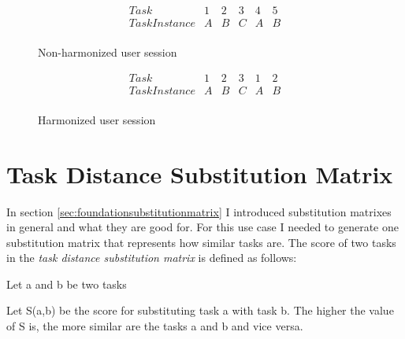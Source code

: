 \begin{figure}[h]
\[
\begin{array}{r|ccccc}
	Task & 1 & 2 & 3 & 4 & 5\\
	\hline
	TaskInstance & A & B & C & A & B\\
\end{array} 
\]
\caption{Non-harmonized user session}
\label{fig:nonharmonized}
\end{figure}

\begin{figure}[h]
\[
\begin{array}{r|ccccc}
	Task & 1 & 2 & 3 & 1 & 2\\
	\hline
	TaskInstance & A & B & C & A & B\\
\end{array} 
\]
\caption{Harmonized user session}
\label{fig:harmonized}
\end{figure}


\section{Task Distance Substitution Matrix}
In section \ref{sec:foundationsubstitutionmatrix} I introduced substitution matrixes in general and what they are good for. 
For this use case I needed to generate one substitution matrix that represents how similar tasks are. 
The score of two tasks in the \textit{task distance substitution matrix} is defined as follows:
\begin{definition}
	\item Let a and b be two tasks
	\item Let S(a,b) be the score for substituting task a with task b. The higher the value of S is, the more similar are the tasks a and b and vice versa.
\end{definition}

